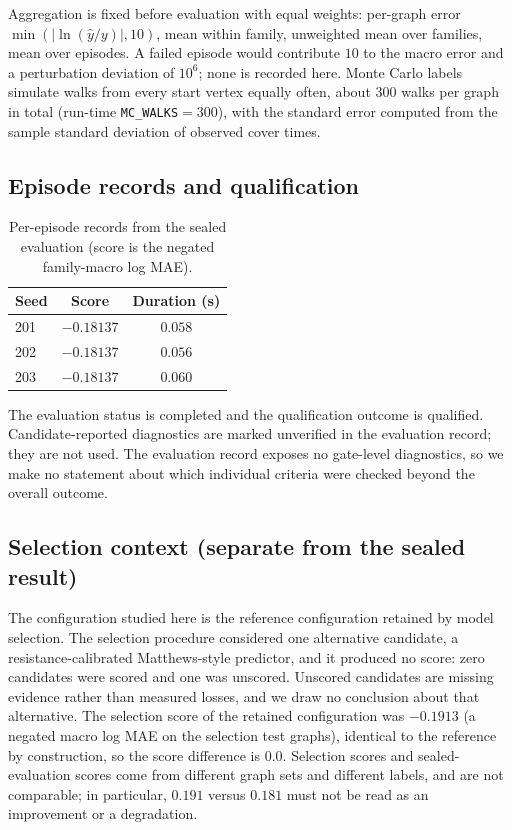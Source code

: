 \documentclass{article}
\begin{document}
Aggregation is fixed before evaluation with equal weights: per-graph error $\min(|\ln(\hat y/y)|,10)$, mean within family, unweighted mean over families, mean over episodes. A failed episode would contribute $10$ to the macro error and a perturbation deviation of $10^{6}$; none is recorded here. Monte Carlo labels simulate walks from every start vertex equally often, about $300$ walks per graph in total (run-time \texttt{MC\_WALKS}$=300$), with the standard error computed from the sample standard deviation of observed cover times. %

\subsection{Episode records and qualification}
\begin{table}[h]
\centering
\caption{Per-episode records from the sealed evaluation (score is the negated family-macro log MAE).}
\label{tab:episodes}
\small
\begin{tabular}{lcc}
\toprule
Seed & Score & Duration (s) \\
\midrule
201 & $-0.18137$ & $0.058$ \\ %
202 & $-0.18137$ & $0.056$ \\
203 & $-0.18137$ & $0.060$ \\
\bottomrule
\end{tabular}
\end{table}

The evaluation status is completed and the qualification outcome is qualified. %
Candidate-reported diagnostics are marked unverified in the evaluation record; they are not used. The evaluation record exposes no gate-level diagnostics, so we make no statement about which individual criteria were checked beyond the overall outcome.

\subsection{Selection context (separate from the sealed result)}
The configuration studied here is the reference configuration retained by model selection. The selection procedure considered one alternative candidate, a resistance-calibrated Matthews-style predictor, and it produced no score: zero candidates were scored and one was unscored. %
Unscored candidates are missing evidence rather than measured losses, and we draw no conclusion about that alternative. The selection score of the retained configuration was $-0.1913$ (a negated macro log MAE on the selection test graphs), identical to the reference by construction, so the score difference is $0.0$. %
Selection scores and sealed-evaluation scores come from different graph sets and different labels, and are not comparable; in particular, $0.191$ versus $0.181$ must not be read as an improvement or a degradation.
\end{document}
